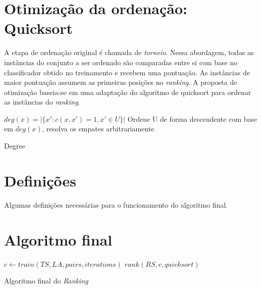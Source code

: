 \section{Otimização da ordenação: Quicksort}
A etapa de ordenação original é chamada de \emph{torneio}. Nessa abordagem, todas as instâncias do conjunto a ser ordenado são comparadas entre si com base no classificador obtido no treinamento e recebem uma pontuação. As instâncias de maior pontuação assumem as primeiras posições no \emph{ranking}. A proposta de otimização baseia-se em uma adaptação do algoritmo de quicksort para ordenar as instâncias do \emph{ranking}.

\begin{algorithm}
\begin{algorithmic}

\STATE $deg(x) = |\{x': c(x, x')=1, x'\in U\}|$
\ENDFOR
\STATE Ordene U de forma descendente com base em $deg(x)$, resolva os empates arbitrariamente

\caption{Degree}
\label{alg:degree}

\end{algorithmic}
\end{algorithm}


\section{Definições}
Algumas definições necessárias para o funcionamento do algoritmo final.

\section{Algoritmo final}

\begin{algorithm}
\begin{algorithmic}

\STATE $c \gets train(TS, LA, pairs, iterations)$
\STATE $rank(RS, c, quicksort)$

\caption{Algoritmo final do \emph{Ranking}}
\label{alg:ranking}

\end{algorithmic}
\end{algorithm}
